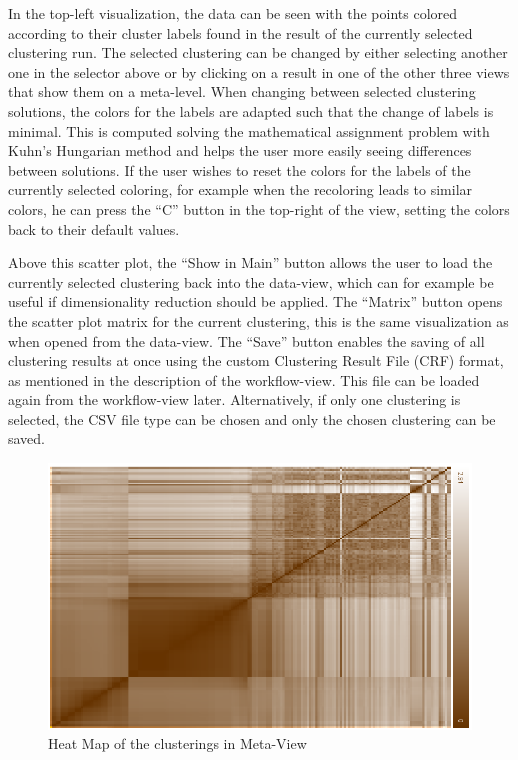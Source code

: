 \documentclass[
	a4paper,
	english,
	twoside,
	openright,               
	11pt                            
	]{report}
\begin{document}
In the top-left visualization, the data can be seen with the points colored according to their cluster labels found in the result of the currently selected clustering run. The selected clustering can be changed by either selecting another one in the selector above or by clicking on a result in one of the other three views that show them on a meta-level. When changing between selected clustering solutions, the colors for the labels are adapted such that the change of labels is minimal. This is computed solving the mathematical assignment problem with Kuhn’s Hungarian method \cite{Kuhn2010} and helps the user more easily seeing differences between solutions. If the user wishes to reset the colors for the labels of the currently selected coloring, for example when the recoloring leads to similar colors, he can press the ``C'' button in the top-right of the view, setting the colors back to their default values.

Above this scatter plot, the ``Show in Main'' button allows the user to load the currently selected clustering back into the data-view, which can for example be useful if dimensionality reduction should be applied. The ``Matrix'' button opens the scatter plot matrix for the current clustering, this is the same visualization as when opened from the data-view. The ``Save'' button enables the saving of all clustering results at once using the custom Clustering Result File (CRF) format, as mentioned in the description of the workflow-view. This file can be loaded again from the workflow-view later. Alternatively, if only one clustering is selected, the CSV file type can be chosen and only the chosen clustering can be saved.

\begin{figure}[h]
	\centering
	\includegraphics[scale=.6]{heat-map}
	\caption{Heat Map of the clusterings in Meta-View}
	\label{fig:heatmap}
\end{figure}
\end{document}

